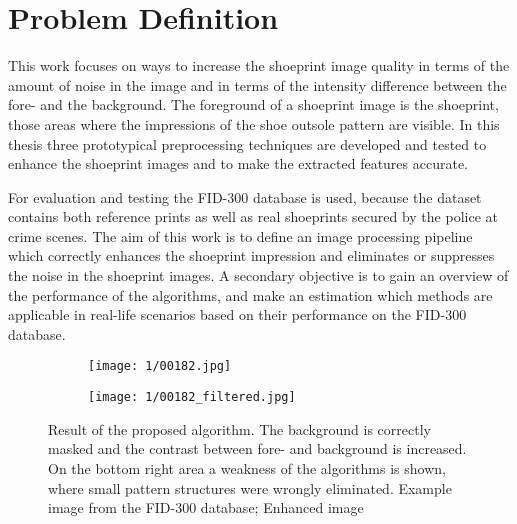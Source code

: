 \documentclass[draft,final]{vutinfth} %
\begin{document}
\section{Problem Definition}
\par
This work focuses on ways to increase the shoeprint image quality in terms of the amount of noise in the image and in terms of the intensity difference between the fore- and the background.
The foreground of a shoeprint image is the shoeprint, those areas where the impressions of the shoe outsole pattern are visible.
In this thesis three prototypical preprocessing techniques are developed and tested to enhance the shoeprint images and to make the extracted features accurate. 
\par
For evaluation and testing the FID-300 database is used, because the dataset contains both reference prints as well as real shoeprints secured by the police at crime scenes.
The aim of this work is to define an image processing pipeline which correctly enhances the shoeprint impression and eliminates or suppresses the noise in the shoeprint images.
A secondary objective is to gain an overview of the performance of the algorithms, and make an estimation which methods are applicable in real-life scenarios based on their performance on the FID-300 database. 

\begin{figure}[h]
  \centering
  \begin{subfigure}[t]{0.45\columnwidth}
    \centering
    \texttt{[image: 1/00182.jpg]}
    \subcaption{}
    \label{fig:intro:orig}
  \end{subfigure}
  \begin{subfigure}[t]{0.45\columnwidth}
    \centering
    \texttt{[image: 1/00182\_filtered.jpg]}
    \subcaption{}
    \label{fig:intro:enhanced}
  \end{subfigure}
  \caption{Result of the proposed algorithm. The background is correctly masked and the contrast between fore- and background is increased. On the bottom right area a weakness of the algorithms is shown, where small pattern structures were wrongly eliminated.  Example image from the FID-300 database;  Enhanced image}
  \label{fig:example}
\end{figure}
\end{document}
